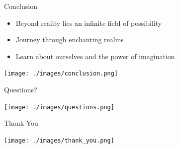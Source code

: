 \documentclass{beamer}
\begin{document}
\begin{frame}{Conclusion}
    \begin{itemize}
        \item Beyond reality lies an infinite field of possibility
        \item Journey through enchanting realms
        \item Learn about ourselves and the power of imagination
    \end{itemize}
    \begin{center}
        \texttt{[image: ./images/conclusion.png]}
    \end{center}
\end{frame}

\begin{frame}{Questions?}
    \begin{center}
        \texttt{[image: ./images/questions.png]}
    \end{center}
\end{frame}

\begin{frame}{Thank You}
    \begin{center}
        \texttt{[image: ./images/thank\_you.png]}
    \end{center}
\end{frame}
\end{document}
